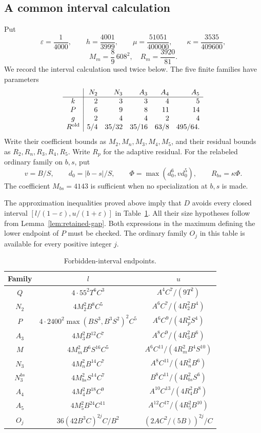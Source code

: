 \documentclass[12pt]{article}
\numberwithin{equation}{section}
\begin{document}
\subsection{A common interval calculation}

Put
\[
 \varepsilon=\frac1{4000},\qquad h=\frac{4001}{3999},\qquad
 \mu=\frac{51051}{400000},\qquad \kappa=\frac{3535}{409600},
\]\[
 M_m=\frac89\,608^2,\quad R_m=\frac{3920}{81}.
\]
We record the interval calculation used twice below. The five finite
families have parameters
\begin{equation}\label{eq:pr-family-parameters}
\begin{array}{c|rrrrr}
 &N_2&N_3&A_3&A_4&A_5\\ \hline
 k&2&3&3&4&5\\
 P&6&9&8&11&14\\
 g&2&4&4&2&4\\
 R^{\rm old}&5/4&35/32&35/16&63/8&495/64 .
\end{array}
\end{equation}
Write their coefficient bounds as \(M_2,M_n,M_3,M_4,M_5\), and their
residual bounds as \(R_2,R_n,R_3,R_4,R_5\). Write \(R_p\) for the
adaptive residual. For the relabeled ordinary family on \(b,s\), put
\[
 v=B/S,\qquad d_0=|b-s|/S,\qquad
 \Phi=\max(d_0^6,vd_0^5),\qquad R_{bs}=\kappa\Phi.
\]
The coefficient \(M_{bs}=4143\) is sufficient when no specialization
at \(b,s\) is made.

The approximation inequalities proved above imply that \(D\) avoids
every closed interval \([l/(1-\varepsilon),u/(1+\varepsilon)]\) in
Table~\ref{tab:pr-windows}. All their size hypotheses follow from
Lemma~\ref{lem:retained-gap}. Both expressions in the maximum defining
the lower endpoint of \(P\) must be checked. The ordinary family
\(O_j\) in this table is available for every positive integer \(j\).
\begin{table}[htbp]
\centering\small
\caption{Forbidden-interval endpoints.}\label{tab:pr-windows}
\setlength{\tabcolsep}{4pt}
\begin{tabular}{c|c|c}
Family&\(l\)&\(u\)\\\hline
\(Q\)&\(4\cdot55^2T^6C^3\)&\(A^4C^7/(9T^2)\)\\
\(N_2\)&\(4M_2^2B^8C^5\)&\(A^6C^7/(4R_2^2B^4)\)\\
\(P\)&\(4\cdot2400^2\max(BS^3,B^3S^2)^2C^5\)&\(A^6C^9/(4R_p^2S^4)\)\\
\(A_3\)&\(4M_3^2B^{12}C^7\)&\(A^8C^9/(4R_3^2B^6)\)\\
\(M\)&\(4M_m^2B^6S^{16}C^5\)&\(A^6C^{11}/(4R_m^2B^4S^{10})\)\\
\(N_3\)&\(4M_n^2B^{14}C^7\)&\(A^8C^{11}/(4R_n^2B^6)\)\\
\(N_3^{bs}\)&\(4M_{bs}^2S^{14}C^7\)&\(B^8C^{11}/(4R_{bs}^2S^6)\)\\
\(A_4\)&\(4M_4^2B^{18}C^9\)&\(A^{10}C^{13}/(4R_4^2B^8)\)\\
\(A_5\)&\(4M_5^2B^{24}C^{11}\)&\(A^{12}C^{17}/(4R_5^2B^{10})\)\\
\(O_j\)&\(36(42B^3C)^{2j}C/B^2\)&\((2AC^2/(5B))^{2j}/C\)
\end{tabular}
\end{table}
\end{document}
